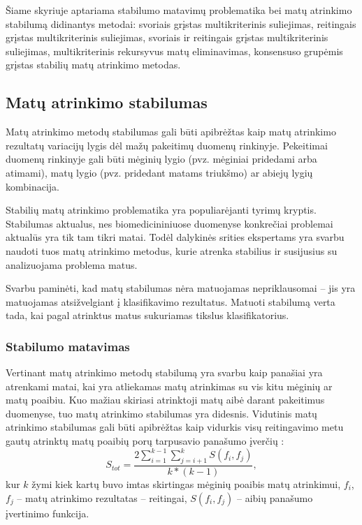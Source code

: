 Šiame skyriuje aptariama stabilumo matavimų problematika bei matų atrinkimo stabilumą didinantys metodai: svoriais grįstas multikriterinis suliejimas, reitingais grįstas multikriterinis suliejimas, svoriais ir reitingais grįstas multikriterinis suliejimas, multikriterinis rekursyvus matų eliminavimas, konsensuso grupėmis grįstas stabilių matų atrinkimo metodas.

\subsection{Matų atrinkimo stabilumas}

Matų atrinkimo metodų stabilumas gali būti apibrėžtas kaip matų atrinkimo rezultatų variacijų lygis dėl mažų pakeitimų duomenų rinkinyje. Pekeitimai duomenų rinkinyje gali būti mėginių lygio (pvz. mėginiai pridedami arba atimami), matų lygio (pvz. pridedant matams triukšmo) ar abiejų lygių kombinacija.

Stabilių matų atrinkimo problematika yra populiarėjanti tyrimų kryptis. Stabilumas aktualus, nes biomedicininiuose duomenyse konkrečiai problemai aktualūs yra tik tam tikri matai. Todėl dalykinės srities ekspertams yra svarbu naudoti tuos matų atrinkimo metodus, kurie atrenka stabilius ir susijusius su analizuojama problema matus. 

Svarbu paminėti, kad matų stabilumas nėra matuojamas nepriklausomai -- jis yra matuojamas atsižvelgiant į klasifikavimo rezultatus. Matuoti stabilumą verta tada, kai pagal atrinktus matus sukuriamas tikslus klasifikatorius.

\subsubsection{Stabilumo matavimas}

Vertinant matų atrinkimo metodų stabilumą yra svarbu kaip panašiai yra atrenkami matai, kai yra atliekamas matų atrinkimas su vis kitu mėginių ar matų poaibiu. Kuo mažiau skiriasi atrinktoji matų aibė darant pakeitimus duomenyse, tuo matų atrinkimo stabilumas yra didesnis. Vidutinis matų atrinkimo stabilumas gali būti apibrėžtas kaip vidurkis visų reitingavimo metu gautų atrinktų matų poaibių porų tarpusavio panašumo įverčių \cite{kalousis2007stability}:
\begin{equation}
 S_{tot}=\frac{2\sum_{i=1}^{k-1}\sum_{j=i+1}^{k} S(f_i, f_j)}{k*(k-1)},
\end{equation} 
kur $k$ žymi kiek kartų buvo imtas skirtingas mėginių poaibis matų atrinkimui,
$f_i$, $f_j$ -- matų atrinkimo rezultatas -- reitingai, 
$S(f_i, f_j)$ -- aibių panašumo įvertinimo funkcija.

